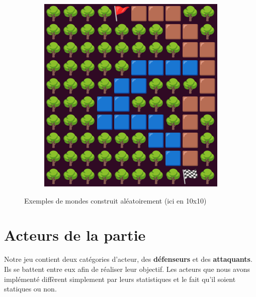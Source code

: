 \documentclass{article}
\begin{document}
\begin{figure}[!h]
\begin{subfigure}{0.3\textwidth}
    \end{subfigure}
    \hfill
    \begin{subfigure}{0.3\textwidth}
        \includegraphics[width=\textwidth]{world3.png}
    \end{subfigure}
    \caption{Exemples de mondes construit aléatoirement (ici en 10x10)}
    \label{mondeexemple}
\end{figure}

\newpage
\section{Acteurs de la partie}
\label{actor}
Notre jeu contient deux catégories d'acteur, des \textbf{défenseurs} et des \textbf{attaquants}. Ils se battent entre eux afin de réaliser leur objectif. Les acteurs que nous avons implémenté diffèrent simplement par leurs statistiques et le fait qu'il soient statiques ou non.
\end{document}
